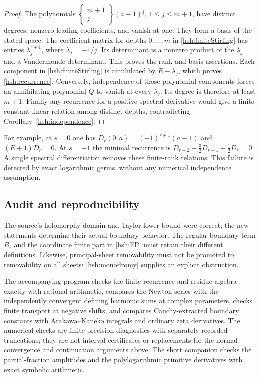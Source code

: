 \begin{proof}
The polynomials
$\left\{\begin{smallmatrix}m+1\\j\end{smallmatrix}\right\}
(a-1)^{\underline j}$, $1\leq j\leq m+1$, have distinct degrees,
nonzero leading coefficients, and vanish at one.  They form a basis
of the stated space.  The coefficient matrix for depths $0,\ldots,m$
in \eqref{hsh:finiteStirling} has entries $\lambda_j^{r+1}$,
where $\lambda_j=-1/j$.  Its determinant is a nonzero product
of the $\lambda_j$ and a Vandermonde determinant.  This proves
the rank and basis assertions.  Each component in
\eqref{hsh:finiteStirling} is annihilated by $E-\lambda_j$,
which proves \eqref{hsh:recurrence}.  Conversely, independence
of those polynomial components forces an annihilating polynomial
$Q$ to vanish at every $\lambda_j$.  Its degree is therefore
at least $m+1$.  Finally any recurrence for a positive spectral
derivative would give a finite constant linear relation among
distinct depths, contradicting Corollary~\ref{hsh:independence}.
\end{proof}

For example, at $s=0$ one has
$D_r(0;a)=(-1)^{r+1}(a-1)$ and $(E+1)D_r=0$.
At $s=-1$ the minimal recurrence is
$D_{r+2}+\tfrac32D_{r+1}+\tfrac12D_r=0$.
A single spectral differentiation removes these finite-rank
relations.  This failure is detected by exact logarithmic germs,
without any numerical independence assumption.

\subsection{Audit and reproducibility}

The source's holomorphy domain and Taylor lower bound were correct;
the new statements determine their actual boundary behavior.  The
regular boundary term $B_r$ and the coordinate finite part in
\eqref{hsh:FP} must retain their different definitions.  Likewise,
principal-sheet removability must not be promoted to removability on
all sheets: \eqref{hsh:monodromy} supplies an explicit obstruction.

The accompanying program  checks the
finite recurrence and residue algebra exactly with rational arithmetic,
compares the Newton series with the independently convergent defining
harmonic sums at complex parameters, checks finite transport at negative
shifts, and compares Cauchy-extracted boundary constants with
Arakawa--Kaneko integrals and ordinary zeta derivatives.  The numerical
checks are finite-precision diagnostics with separately recorded
truncations; they are not interval certificates or replacements for
the normal-convergence and continuation arguments above.
The short companion  checks the
partial-fraction amplitudes and the polylogarithmic primitive derivatives
with exact symbolic arithmetic.
